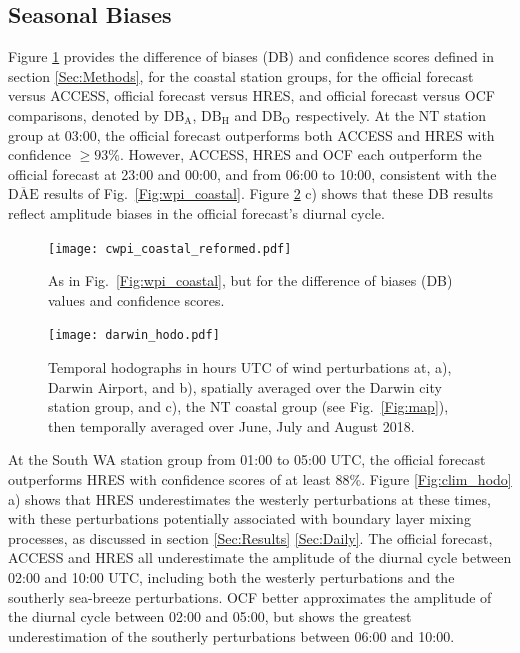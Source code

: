 \documentclass[twocol]{ametsoc}
\begin{document}
\subsection{Seasonal Biases}
\label{Sec:Seasonal}
Figure \ref{Fig:cwpi_coastal} provides the difference of biases (DB) and confidence scores defined in section \ref{Sec:Methods}, for the coastal station groups, for the official forecast versus ACCESS, official forecast versus HRES, and official forecast versus OCF comparisons, denoted by $\text{DB}_\text{A}$, $\text{DB}_\text{H}$ and $\text{DB}_\text{O}$ respectively. At the NT station group at 03:00, the official forecast outperforms both ACCESS and HRES with confidence $\geq 93\%$. However, ACCESS, HRES and OCF each outperform the official forecast at 23:00 and 00:00, and from 06:00 to 10:00, consistent with the $\overline{\text{DAE}}$ results of Fig.~\ref{Fig:wpi_coastal}. Figure \ref{Fig:darwin_hodo} c) shows that these DB results reflect amplitude biases in the official forecast's diurnal cycle.

\begin{figure}
\centering
\texttt{[image: cwpi\_coastal\_reformed.pdf]}
\caption{As in Fig.~\ref{Fig:wpi_coastal}, but for the difference of biases (DB) values and confidence scores.}
\label{Fig:cwpi_coastal}
\end{figure}

\begin{figure}
\centering
\texttt{[image: darwin\_hodo.pdf]}
\caption{Temporal hodographs in hours UTC of wind perturbations at, a), Darwin Airport, and b), spatially averaged over the Darwin city station group, and c), the NT coastal group (see Fig.~\ref{Fig:map}), then temporally averaged over June, July and August 2018.}
\label{Fig:darwin_hodo}
\end{figure}

At the South WA station group from 01:00 to 05:00 UTC, the official forecast outperforms HRES with confidence scores of at least $88\%$. Figure \ref{Fig:clim_hodo} a) shows that HRES underestimates the westerly perturbations at these times, with these perturbations potentially associated with boundary layer mixing processes, as discussed in section \ref{Sec:Results} \ref{Sec:Daily}. The official forecast, ACCESS and HRES all underestimate the amplitude of the diurnal cycle between 02:00 and 10:00 UTC, including both the westerly perturbations and the southerly sea-breeze perturbations. OCF better approximates the amplitude of the diurnal cycle between 02:00 and 05:00, but shows the greatest underestimation of the southerly perturbations between 06:00 and 10:00.
\end{document}
